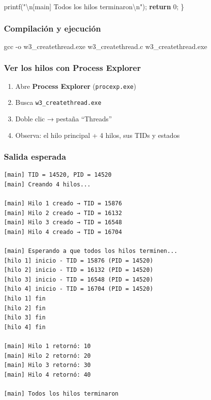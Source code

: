 \documentclass[
  spanish,
]{article}
\newenvironment{Shaded}{}{}
\newcommand{\AttributeTok}[1]{\textcolor[rgb]{0.49,0.56,0.16}{#1}}
\newcommand{\ControlFlowTok}[1]{\textcolor[rgb]{0.00,0.44,0.13}{\textbf{#1}}}
\newcommand{\DecValTok}[1]{\textcolor[rgb]{0.25,0.63,0.44}{#1}}
\newcommand{\NormalTok}[1]{#1}
\newcommand{\OperatorTok}[1]{\textcolor[rgb]{0.40,0.40,0.40}{#1}}
\newcommand{\SpecialCharTok}[1]{\textcolor[rgb]{0.25,0.44,0.63}{#1}}
\newcommand{\StringTok}[1]{\textcolor[rgb]{0.25,0.44,0.63}{#1}}
\providecommand{\tightlist}{%
  \setlength{\itemsep}{0pt}\setlength{\parskip}{0pt}}
\begin{document}
\begin{Shaded}
\begin{Highlighting}[]
\NormalTok{    printf}\OperatorTok{(}\StringTok{"}\SpecialCharTok{\textbackslash{}n}\StringTok{[main] Todos los hilos terminaron}\SpecialCharTok{\textbackslash{}n}\StringTok{"}\OperatorTok{);}
    \ControlFlowTok{return} \DecValTok{0}\OperatorTok{;}
\OperatorTok{\}}
\end{Highlighting}
\end{Shaded}

\subsubsection{Compilación y
ejecución}\label{compilaciuxf3n-y-ejecuciuxf3n-2}

\begin{Shaded}
\begin{Highlighting}[]
\NormalTok{gcc }\AttributeTok{{-}o}\NormalTok{ w3\_createthread.exe w3\_createthread.c}
\NormalTok{w3\_createthread.exe}
\end{Highlighting}
\end{Shaded}

\subsubsection{Ver los hilos con Process
Explorer}\label{ver-los-hilos-con-process-explorer}

\begin{enumerate}
\def\labelenumi{\arabic{enumi}.}
\tightlist
\item
  Abre \textbf{Process Explorer} (\texttt{procexp.exe})
\item
  Busca \texttt{w3\_createthread.exe}
\item
  Doble clic → pestaña ``Threads''
\item
  Observa: el hilo principal + 4 hilos, sus TIDs y estados
\end{enumerate}

\subsubsection{Salida esperada}\label{salida-esperada-2}

\begin{verbatim}
[main] TID = 14520, PID = 14520
[main] Creando 4 hilos...

[main] Hilo 1 creado → TID = 15876
[main] Hilo 2 creado → TID = 16132
[main] Hilo 3 creado → TID = 16548
[main] Hilo 4 creado → TID = 16704

[main] Esperando a que todos los hilos terminen...
[hilo 1] inicio - TID = 15876 (PID = 14520)
[hilo 2] inicio - TID = 16132 (PID = 14520)
[hilo 3] inicio - TID = 16548 (PID = 14520)
[hilo 4] inicio - TID = 16704 (PID = 14520)
[hilo 1] fin
[hilo 2] fin
[hilo 3] fin
[hilo 4] fin

[main] Hilo 1 retornó: 10
[main] Hilo 2 retornó: 20
[main] Hilo 3 retornó: 30
[main] Hilo 4 retornó: 40

[main] Todos los hilos terminaron
\end{verbatim}
\end{document}

